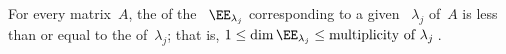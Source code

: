 \begin{theorem} \label{thm:dimee} 
For every matrix~\(A\), the  of the ~\(\EE_{\lambda_j}\) corresponding to a given ~\(\lambda_j\) of~\(A\) is less than or equal to the  of~\(\lambda_j\);
that is, \(1\leq\dim\EE_{\lambda_j}\leq\text{multiplicity of }\lambda_j\)\,.  
\end{theorem}
